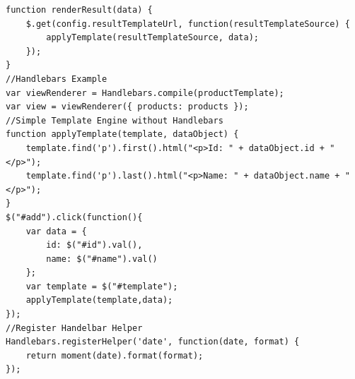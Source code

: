 \begin{multicols*}{4}
\begin{verbatim}
function renderResult(data) {
	$.get(config.resultTemplateUrl, function(resultTemplateSource) {
		applyTemplate(resultTemplateSource, data);
	});
}
//Handlebars Example
var viewRenderer = Handlebars.compile(productTemplate);
var view = viewRenderer({ products: products });
//Simple Template Engine without Handlebars
function applyTemplate(template, dataObject) {
    template.find('p').first().html("<p>Id: " + dataObject.id + "</p>");
    template.find('p').last().html("<p>Name: " + dataObject.name + "</p>");
}
$("#add").click(function(){
    var data = {
        id: $("#id").val(),
        name: $("#name").val()
    };
    var template = $("#template");
    applyTemplate(template,data);
});
//Register Handelbar Helper
Handlebars.registerHelper('date', function(date, format) {
	return moment(date).format(format);
});
\end{verbatim}




\end{multicols*}
